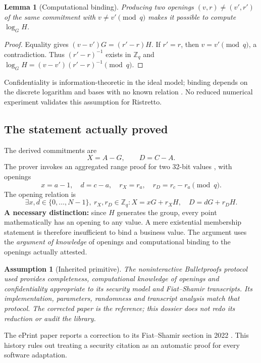 \documentclass[11pt,a4paper]{article}
\newtheorem{lemma}[theorem]{Lemma}
\newtheorem{assumption}[theorem]{Assumption}
\newcommand{\Zq}{\mathbb Z_q}
\begin{document}
\begin{lemma}[Computational binding]
Producing two openings $(v,r)\ne(v',r')$ of the same commitment with
$v\ne v'\pmod q$ makes it possible to compute $\log_G H$.
\end{lemma}
\begin{proof}
Equality gives $(v-v')G=(r'-r)H$. If $r'=r$, then $v=v'\pmod q$,
a contradiction. Thus $(r'-r)^{-1}$ exists in $\Zq$ and
$\log_G H=(v-v')(r'-r)^{-1}\pmod q$.
\end{proof}
Confidentiality is information-theoretic in the ideal model; binding depends
on the discrete logarithm and bases with no known relation
\cite{pedersen1992,daleknotes}. No reduced numerical experiment validates
this assumption for Ristretto.

\subsection{The statement actually proved}
The derived commitments are
\[
 X=A-G,\qquad D=C-A.
\]
The prover invokes an aggregated range proof for two 32-bit values
\cite{bulletproofs,dalek5}, with openings
\[
 x=a-1,\quad d=c-a,\quad r_X=r_a,\quad r_D=r_c-r_a\pmod q.
\]
The opening relation is
\begin{equation}\label{eq:relation}
\exists x,d\in\{0,\ldots,N-1\},\ r_X,r_D\in\Zq:
 X=xG+r_XH,\quad D=dG+r_DH.
\end{equation}
\textbf{A necessary distinction:} since $H$ generates the group, every point
mathematically has an opening to any value. A mere existential membership
statement is therefore insufficient to bind a business value. The argument
uses the \emph{argument of knowledge} of openings and computational binding
to the openings actually attested.

\begin{assumption}[Inherited primitive]
The noninteractive Bulletproofs protocol used provides completeness,
computational knowledge of openings and confidentiality appropriate to its
security model and Fiat--Shamir transcripts.
Its implementation, parameters, randomness and transcript analysis match
that protocol. The corrected paper is the reference; this dossier does not
redo its reduction or audit the library.
\end{assumption}
The ePrint paper reports a correction to its Fiat--Shamir section in 2022
\cite{bulletproofs}. This history rules out treating a security citation
as an automatic proof for every software adaptation.
\end{document}
